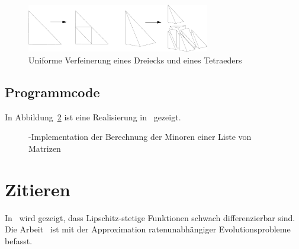 \begin{figure}
\begin{center}
\includegraphics[width=8cm]{pics/beispiel_skizze.pdf}
\end{center}
\caption{\label{fig:skizze} Uniforme Verfeinerung eines
Dreiecks und eines Tetraeders}
\end{figure}

\subsection{Programmcode}
In Abbildung~\ref{fig:matlab_code} ist eine Realisierung in 
\matlab\ gezeigt. 

\begin{figure}

\caption{\label{fig:matlab_code} \matlab-Implementation der
Berechnung der Minoren einer Liste von Matrizen}
\end{figure}

\section{Zitieren}
In~\cite[Theorem~9.99]{Evan10-book} wird gezeigt, dass
Lipschitz-stetige Funktionen schwach differenzierbar sind. 
Die Arbeit~\cite{Bart13-pre} ist
mit der Approximation ratenunabh\"angiger Evolutionsprobleme
befasst.  